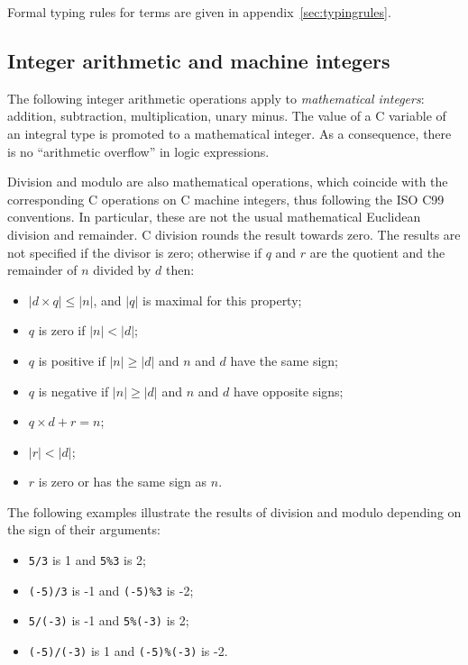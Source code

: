 Formal typing rules for terms are given in appendix~\ref{sec:typingrules}.

\subsection{Integer arithmetic and machine integers}

The following integer arithmetic operations apply to
\emph{mathematical integers}: addition, subtraction, multiplication,
unary minus. The value of a C variable of an integral type is promoted
to a mathematical integer. As a consequence, there is no
``arithmetic overflow'' in logic expressions.

Division and modulo are also mathematical operations, which coincide
with the corresponding C operations on C machine integers, thus
following the ISO C99 conventions. In particular, these are not the
usual mathematical Euclidean division and remainder.
C division
rounds the result towards zero. The results are not specified if the
divisor is zero; otherwise if $q$ and $r$ are the quotient and the
remainder of $n$ divided by $d$ then:
\begin{itemize}
\item $|d\times q| \leq |n|$, and $|q|$ is maximal for this property;
\item $q$ is zero if $|n|<|d|$;
\item $q$ is positive if $|n|\geq|d|$ and $n$ and $d$ have the same sign;
\item $q$ is negative if $|n|\geq|d|$ and $n$ and $d$ have opposite signs;
\item $q\times d+r = n$;
\item $|r|<|d|$;
\item $r$ is zero or has the same sign as $n$.
\end{itemize}

\begin{example}
  The following examples illustrate the results of division and modulo
  depending on the sign of their arguments:
  \begin{itemize}
  \item \lstinline|5/3| is 1 and \lstinline|5%3| is 2;
  \item \lstinline|(-5)/3| is -1 and \lstinline|(-5)%3| is -2;
  \item \lstinline|5/(-3)| is -1 and \lstinline|5%(-3)| is 2;
  \item \lstinline|(-5)/(-3)| is 1 and \lstinline|(-5)%(-3)| is -2.
  \end{itemize}
\end{example}

